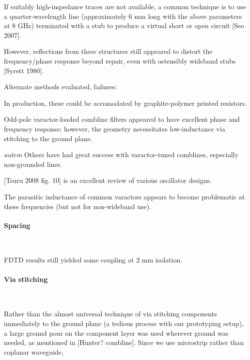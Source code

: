 \documentclass[paper.tex]{subfiles}
\begin{document}
If suitably high-impedance traces are not available, a common technique is to use a quarter-wavelength line (approximately 6 mm long with the above parameters at 8 GHz) terminated with a stub to produce a virtual short or open circuit [Seo 2007]. 

However, reflections from these structures still appeared to distort the frequency/phase response beyond repair, even with ostensibly wideband stubs [Syrett 1980].

\noindent{}

Alternate methods evaluated, failures: 


In production, these could be accomodated by graphite-polymer printed resistors. 


Odd-pole varactor-loaded combline filters appeared to have excellent phase and frequency response; however, the geometry necessitates low-inductance via stitching to the ground plane.

\begin{autem}
	{\it autem} Others have had great success with varactor-tuned comblines, especially non-grounded lines.
\end{autem}

[Tsuru 2008 fig. 10] is an excellent review of various oscillator designs.

The parasitic inductance of common varactors appears to become problematic at these frequencies (but not for non-wideband use).

\paragraph{\textbf{Spacing}}\

FDTD results still yielded some coupling at 2 mm isolation.

\paragraph{\textbf{Via stitching}}\

Rather than the almost universal technique of via stitching components immediately to the ground plane (a tedious process with our prototyping setup), a large ground pour on the component layer was used wherever ground was needed, as mentioned in [Hunter? combline]. Since we use microstrip rather than coplanar waveguide, 
\end{document}
